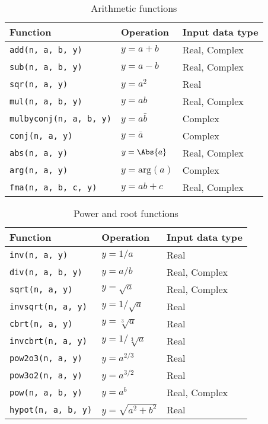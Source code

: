 \begin{table}
  \begin{tabularx}{\textwidth}{LLL}
    \toprule
    Function & Operation & Input data type \\
    \midrule
    \texttt{add(n, a, b, y)}       & $y = a + b$           & Real, Complex \\
    \texttt{sub(n, a, b, y)}       & $y = a - b$           & Real, Complex \\
    \texttt{sqr(n, a, y)}          & $y = a^2$             & Real          \\
    \texttt{mul(n, a, b, y)}       & $y = ab$              & Real, Complex \\
    \texttt{mulbyconj(n, a, b, y)} & $y = a\bar{b}$        & Complex       \\
    \texttt{conj(n, a, y)}         & $y = \bar{a}$         & Complex       \\
    \texttt{abs(n, a, y)}          & $y = \Abs{a}$         & Real, Complex \\
    \texttt{arg(n, a, y)}          & $y = \mathrm{arg}(a)$ & Complex       \\
    \texttt{fma(n, a, b, c, y)}    & $y = ab + c$          & Real, Complex \\
    \bottomrule
  \end{tabularx}
  \caption{Arithmetic functions}
  \label{tab:Arithmetic functions}
\end{table}

\begin{table}
  \begin{tabularx}{\textwidth}{LLL}
    \toprule
    Function & Operation & Input data type \\
    \midrule
    \texttt{inv(n, a, y)}      & $y = 1 / a$            & Real          \\
    \texttt{div(n, a, b, y)}   & $y = a / b$            & Real, Complex \\
    \texttt{sqrt(n, a, y)}     & $y = \sqrt{a}$         & Real, Complex \\
    \texttt{invsqrt(n, a, y)}  & $y = 1 / \sqrt{a}$     & Real          \\
    \texttt{cbrt(n, a, y)}     & $y = \sqrt[3]{a}$      & Real          \\
    \texttt{invcbrt(n, a, y)}  & $y = 1 / \sqrt[3]{a}$  & Real          \\
    \texttt{pow2o3(n, a, y)}   & $y = a^{2/3}$          & Real          \\
    \texttt{pow3o2(n, a, y)}   & $y = a^{3/2}$          & Real          \\
    \texttt{pow(n, a, b, y)}   & $y = a^b$              & Real, Complex \\
    \texttt{hypot(n, a, b, y)} & $y = \sqrt{a^2 + b^2}$ & Real          \\
    \bottomrule
  \end{tabularx}
  \caption{Power and root functions}
  \label{tab:Power and root functions}
\end{table}

